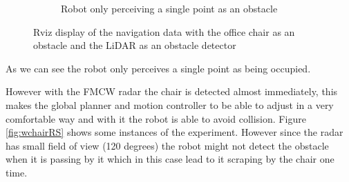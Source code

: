 \begin{figure}[ht!]
\begin{subfigure}[t]{0.49\linewidth}
    \caption{Robot only perceiving a single point as an obstacle}
    \label{fig::rvizwchairscan2}
  \end{subfigure}
  \caption[Navigation data with the office chair as an obstacle with \ac{LiDAR}]{Rviz display of the navigation data with the office chair as an obstacle and the \ac{LiDAR} as an obstacle detector}
  \label{fig::rvizwchairscan}
\end{figure}
 As we can see the robot only perceives a single point as being occupied.

However with the \ac{FMCW} radar the chair is detected almost immediately, this makes the global planner and motion controller to be able to adjust in a very comfortable way and with it the robot is able to avoid collision. Figure \ref{fig:wchairRS} shows some instances of the experiment. However since the radar has small field of view (120 degrees) the robot might not detect the obstacle when it is passing by it which in this case lead to it scraping by the chair one time.

